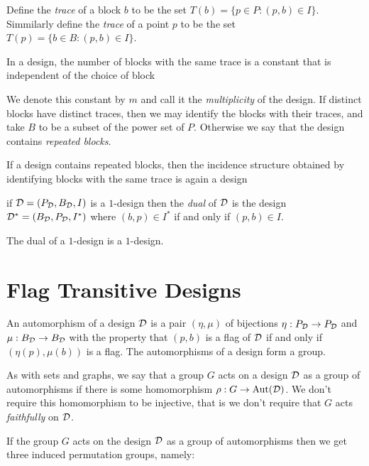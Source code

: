 Define the {\it trace} of a block $b$ to be the set
$T(b) = \{ p \in P : (p,b) \in I \}$.
Simmilarly define the {\it trace} of a point $p$
to be the set $T(p) = \{b \in B : (p,b) \in I \}$.

\begin{proposition}
In a design, the number of blocks with the same trace is a constant 
that is independent of the choice of block
\end{proposition}

We denote this constant by $m$ and call it the 
{\it multiplicity} of the design.
If distinct blocks have distinct traces,
then we may identify the blocks with their traces,
and take $B$ to be a subset of the power set of $P$.
Otherwise we say that the design contains {\it repeated blocks}.

\begin{proposition}
If a design contains repeated blocks,
then the incidence structure obtained by identifying
blocks with the same trace is again a design
\end{proposition}

\begin{definition}
if $\mathcal{D} = (P_{\mathcal{D}}, B_{\mathcal{D}}, I)$ is a $1$-design then the {\it dual} 
of $\mathcal{D}$ is the design $ \mathcal{D}^{*} = (B_{\mathcal{D}}, P_{\mathcal{D}}, I^{*})$
where $(b,p) \in I^{*}$ if and only if $(p,b) \in I$.
\end{definition}

\begin{proposition}
The dual of a $1$-design is a $1$-design.
\end{proposition}



\section{Flag Transitive Designs}

An automorphism of a design $\mathcal{D}$ is a pair $(\eta, \mu)$ of bijections
$\eta : P_{\mathcal{D}} \to P_{\mathcal{D}}$ and $\mu : B_{\mathcal{D}} \to B_{\mathcal{D}}$
with the property that $(p,b)$ is a flag of $\mathcal{D}$
if and only if $(\eta(p), \mu(b))$ is a flag.
The automorphisms of a design form a group.

As with sets and graphs, we say that a group $G$ acts on a design $\mathcal{D}$
as a group of automorphisms if there is some homomorphism $\rho : G \to \operatorname{Aut}(\mathcal{D})$.
We don't require this homomorphism to be injective, that is we don't
require that $G$ acts {\it faithfully} on $\mathcal{D}$.

If the group $G$ acts on the design $\mathcal{D}$ as a group of automorphisms
then we get three induced permutation groups, namely:

